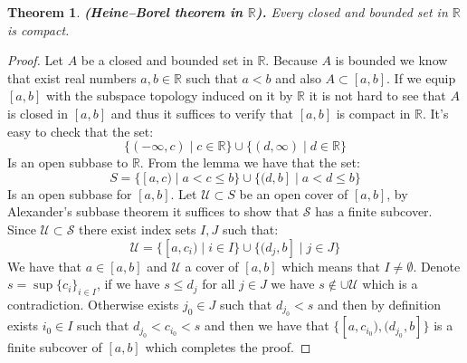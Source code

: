 \documentclass[11pt,a4paper]{article}
\theoremstyle{definition}
\theoremstyle{plain}
\newtheorem{theorem}{Theorem}[section]
\newcommand{\R}{\mathbb{R}}
\renewcommand{\tt}[1]{\textnormal{\textbf{(#1).}}} %
\begin{document}
  \begin{theorem}
    \tt{Heine–Borel theorem in $\R$}
    Every closed and bounded set in $\R$ is compact.
  \end{theorem}
  \begin{proof}
    Let $A$ be a closed and bounded set in $\R$. Because $A$ is bounded
    we know that exist real numbers $a,b \in \R$ such that $a < b$ and
    also $A \subset [a,b]$. If we equip $[a,b]$ with the subspace
    topology induced on it by $\R$ it is not hard to see that $A$ is
    closed in $[a,b]$ and thus it suffices to verify that $[a,b]$
    is compact in $\R$. It's easy to check that the set:
    \[
      \{(-\infty, c) \mid c \in \R\} \cup 
      \{(d, \infty) \mid d \in \R\}
    \]
    Is an open subbase to $\R$. From the lemma we have that the set:
    \[
      S = \{[a, c) \mid a < c \le b\} \cup 
      \{(d, b] \mid a < d \le b\}
    \]
    Is an open subbase for $[a,b]$. Let $\mathcal{U} \subset S$ be an
    open cover of $[a,b]$, by Alexander's subbase theorem it suffices
    to show that $\mathcal{S}$ has a finite subcover. Since 
    $\mathcal{U} \subset \mathcal{S}$ there exist index sets $I,J$ such 
    that:
    \[
      \mathcal{U} = 
      \{[a,c_i) \mid i \in I\} \cup \{(d_j,b] \mid j \in J\}
    \]
    We have that $a \in [a,b]$ and $\mathcal{U}$ a cover of $[a,b]$
    which means that $I \neq \emptyset$. 
    Denote $s = \sup\{c_i\}_{i\in I}$,  if we have $s \le d_j$ for
    all $j \in J$ we have $s \notin \cup\mathcal{U}$ which is a 
    contradiction. Otherwise exists $j_0 \in J$ such that 
    $d_{j_0} < s$ and then by definition exists $i_0 \in I$ such that
    $d_{j_0} < c_{i_0} < s$ and then we have that 
    $\{[a,c_{i_0}), (d_{j_0},b]\}$ is a finite subcover of $[a,b]$ which
    completes the proof.
  \end{proof}
\end{document}
